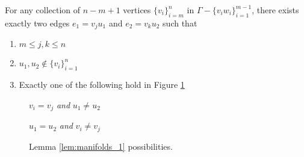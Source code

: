\begin{lem}
    \label{lem:manifolds_1}
    For any collection of \(n - m + 1\) vertices \(\{v_i\}_{i=m}^n\)
    in \(\Gamma - \{v_i w_i\}_{i=1}^{m-1}\), there exists exactly two edges
    \(e_1 = v_j u_1\) and \(e_2 = v_k u_2\) such that
    \begin{enumerate}[label=(\roman*)]
    \item \(m \leq j, k \leq n\)
    \item \(u_1, u_2 \not \in \{v_i\}_{i=1}^n\)
    \item Exactly one of the following hold in Figure \ref{fig:lem:manifolds_1}
    \end{enumerate}
\begin{figure}[h!]
    \centering
        \begin{enumerate*}[label=(\arabic*)]
            \item \label{fig:lem:manifolds_1_1}
            \begin{minipage}{.3\textwidth}
                \centering
                \(v_i = v_j\) \textit{and} \(u_1 \neq u_2\) \\
                \vspace{1em}
            \end{minipage}
            \hspace{3em}

            \item \label{fig:lem:is_surface_1_1:2}
            \begin{minipage}{.3\textwidth}
                \centering
                \(u_1 = u_2\) \textit{and} \(v_i \neq v_j\) \\
                \vspace{1em}
            \end{minipage}
        \end{enumerate*}
    \caption{Lemma \ref{lem:manifolds_1} possibilities.}
    \label{fig:lem:manifolds_1}
\end{figure}
\end{lem}

